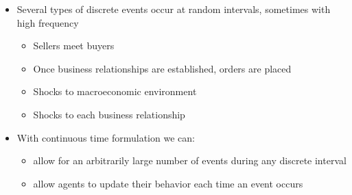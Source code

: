 \documentclass[notes=show]{beamer}
\begin{document}
\begin{frame}%


\begin{itemize}
\item Several types of discrete events occur at random intervals, sometimes with high frequency

\begin{itemize}
\item Sellers meet buyers

\item Once business relationships are established, orders are placed

\item Shocks to macroeconomic environment

\item Shocks to each business relationship

\end{itemize}

\item With continuous time formulation we can:

\begin{itemize}
\item allow for an arbitrarily large number of events during any discrete
interval

\item allow agents to update their behavior each time an event occurs
\end{itemize}
\end{itemize}

\end{frame}%
\end{document}
